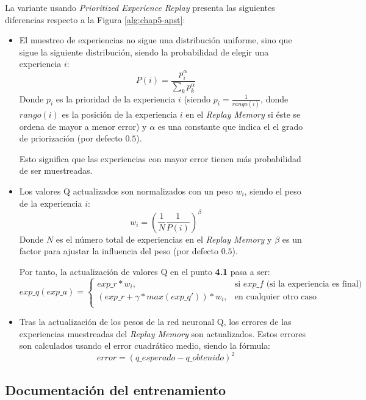 La variante usando \textit{Prioritized Experience Replay} presenta las siguientes diferencias respecto a la Figura \ref{alg:chap5-apst}:
\begin{itemize}
\item El muestreo de experiencias no sigue una distribución uniforme, sino que sigue la siguiente distribución, siendo la probabilidad de elegir una experiencia $i$:
\[P(i)=\frac{p_i^{\alpha}}{\sum_k p_k^{\alpha}}\]
Donde $p_i$ es la prioridad de la experiencia $i$ (siendo $p_i=\frac{1}{rango(i)}$, donde $rango(i)$ es la posición de la experiencia $i$ en el \textit{Replay Memory} si éste se ordena de mayor a menor error) y $\alpha$ es una constante que indica el el grado de priorización (por defecto $0.5$).

Esto significa que las experiencias con mayor error tienen más probabilidad de ser muestreadas.
\item Los valores Q actualizados son normalizados con un peso $w_i$, siendo el peso de la experiencia $i$:
\[w_i=\left(\frac{1}{N} \frac{1}{P(i)}\right)^{\beta}\]
Donde $N$ es el número total de experiencias en el \textit{Replay Memory} y $\beta$ es un factor para ajustar la influencia del peso (por defecto $0.5$).

Por tanto, la actualización de valores Q en el punto \textbf{4.1} pasa a ser:
\[
exp\_q(exp\_a)=
\begin{cases}
	exp\_r * w_i,& \text{si } exp\_f \text{ (si la experiencia es final)}\\
	(exp\_r + \gamma * max(exp\_q')) * w_i,& \text{en cualquier otro caso}\\
\end{cases}
\]
\item Tras la actualización de los pesos de la red neuronal Q, los errores de las experiencias muestreadas del \textit{Replay Memory} son actualizados. Estos errores son calculados usando el error cuadrático medio, siendo la fórmula:
\[error=(q\_esperado - q\_obtenido)^2\]
\end{itemize}

\subsection{Documentación del entrenamiento}

